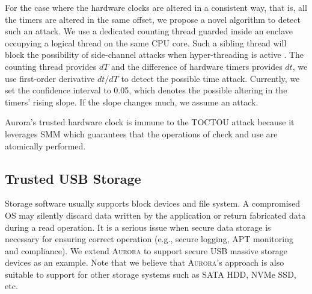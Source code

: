 \documentclass[journal,twocolumn,letterpaper,10pt]{IEEEtran}
\begin{document}
For the case where the hardware clocks are altered in a consistent way, that is, all the timers are altered in the same offset, we propose a novel algorithm to detect such an attack. We use a dedicated counting thread \cite{DBLP:conf/dimva/SchwarzWGMM17} guarded inside an enclave occupying a logical thread on the same CPU core. Such a sibling thread will block the possibility of side-channel attacks when hyper-threading is active \cite{DBLP:conf/sp/ChenWCCZWLL18}. The counting thread provides $dT$ and the difference of hardware timers provides $dt$, we use first-order derivative $dt/dT$ to detect the possible time attack. Currently, we set the confidence interval to 0.05, which denotes the possible altering in the timers' rising slope. If the slope changes much, we assume an attack.

Aurora's trusted hardware clock is immune to the TOCTOU attack because it leverages SMM which guarantees that the operations of check and use are atomically performed.

\subsection{Trusted USB Storage}\label{storage_service}
Storage software usually supports block devices and file system. A compromised OS may silently discard data written by the application or return fabricated data during a read operation. It is a serious issue when secure data storage is  necessary for ensuring correct operation (e.g., secure logging, APT monitoring and compliance). We extend \textsc{Aurora} to support secure USB massive storage devices as an example. Note that we believe that \textsc{Aurora}'s approach is also suitable to support for other storage systems such as SATA HDD, NVMe SSD, etc.

\end{document}
